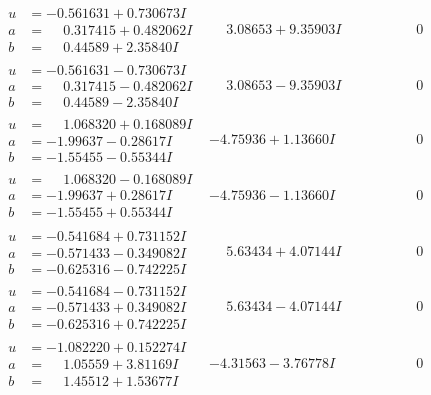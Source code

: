 \documentclass[1p]{elsarticle_modified}
\theoremstyle{definition}
\begin{document}
$$\begin{array}{c|c|c}
\begin{aligned}
u &= -0.561631 + 0.730673 I \\
a &= \phantom{-}0.317415 + 0.482062 I \\
b &= \phantom{-}0.44589 + 2.35840 I\end{aligned}
 & \phantom{-}3.08653 + 9.35903 I & \phantom{-0.000000 } 0 \\ \hline\begin{aligned}
u &= -0.561631 - 0.730673 I \\
a &= \phantom{-}0.317415 - 0.482062 I \\
b &= \phantom{-}0.44589 - 2.35840 I\end{aligned}
 & \phantom{-}3.08653 - 9.35903 I & \phantom{-0.000000 } 0 \\ \hline\begin{aligned}
u &= \phantom{-}1.068320 + 0.168089 I \\
a &= -1.99637 - 0.28617 I \\
b &= -1.55455 - 0.55344 I\end{aligned}
 & -4.75936 + 1.13660 I & \phantom{-0.000000 } 0 \\ \hline\begin{aligned}
u &= \phantom{-}1.068320 - 0.168089 I \\
a &= -1.99637 + 0.28617 I \\
b &= -1.55455 + 0.55344 I\end{aligned}
 & -4.75936 - 1.13660 I & \phantom{-0.000000 } 0 \\ \hline\begin{aligned}
u &= -0.541684 + 0.731152 I \\
a &= -0.571433 - 0.349082 I \\
b &= -0.625316 - 0.742225 I\end{aligned}
 & \phantom{-}5.63434 + 4.07144 I & \phantom{-0.000000 } 0 \\ \hline\begin{aligned}
u &= -0.541684 - 0.731152 I \\
a &= -0.571433 + 0.349082 I \\
b &= -0.625316 + 0.742225 I\end{aligned}
 & \phantom{-}5.63434 - 4.07144 I & \phantom{-0.000000 } 0 \\ \hline\begin{aligned}
u &= -1.082220 + 0.152274 I \\
a &= \phantom{-}1.05559 + 3.81169 I \\
b &= \phantom{-}1.45512 + 1.53677 I\end{aligned}
 & -4.31563 - 3.76778 I & \phantom{-0.000000 } 0 \\ \hline\begin{aligned}

\end{aligned}
\end{array}$$
\end{document}
